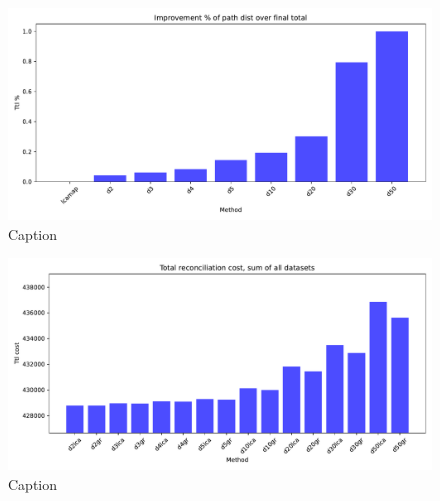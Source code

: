 \documentclass{article}
\begin{document}
\begin{figure}
    \centering
    \includegraphics[width=\textwidth]{plots/pctimprov_duprate0.pdf}
    \caption{Caption}
    \label{fig:enter-label}
\end{figure}



\begin{figure}
    \centering
    \includegraphics[width=\textwidth]{plots/costs_duprate0.pdf}
    \caption{Caption}
    \label{fig:enter-label}
\end{figure}
\end{document}
